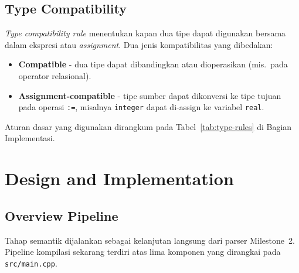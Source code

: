 \documentclass[11pt,a4paper]{article}
\begin{document}
\subsection{Type Compatibility}

\textit{Type compatibility rule} menentukan kapan dua tipe dapat digunakan
bersama dalam ekspresi atau \textit{assignment}. Dua jenis kompatibilitas yang
dibedakan:

\begin{itemize}
    \item \textbf{Compatible} - dua tipe dapat dibandingkan atau dioperasikan
          (mis.\ pada operator relasional).
    \item \textbf{Assignment-compatible} - tipe sumber dapat dikonversi ke
          tipe tujuan pada operasi \texttt{:=}, misalnya \texttt{integer} dapat
          di-assign ke variabel \texttt{real}.
\end{itemize}

Aturan dasar yang digunakan dirangkum pada Tabel~\ref{tab:type-rules} di
Bagian Implementasi.

\section{Design and Implementation}

\subsection{Overview Pipeline}

Tahap semantik dijalankan sebagai kelanjutan langsung dari parser
Milestone~2. Pipeline kompilasi sekarang terdiri atas lima komponen yang
dirangkai pada \texttt{src/main.cpp}.
\end{document}
